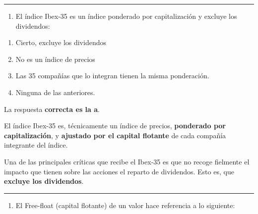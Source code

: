 \documentclass[
  letterpaper,
  DIV=11,
  numbers=noendperiod]{scrreprt}
\providecommand{\tightlist}{%
  \setlength{\itemsep}{0pt}\setlength{\parskip}{0pt}}\usepackage{longtable,booktabs,array}
\begin{document}
\begin{center}\rule{0.5\linewidth}{0.5pt}\end{center}

\begin{enumerate}
\def\labelenumi{\arabic{enumi}.}
\setcounter{enumi}{30}
\tightlist
\item
  El índice Ibex-35 es un índice ponderado por capitalización y excluye
  los dividendos:
\end{enumerate}

\begin{enumerate}
\def\labelenumi{\alph{enumi})}
\item
  Cierto, excluye los dividendos
\item
  No es un índice de precios
\item
  Las 35 compañías que lo integran tienen la misma ponderación.
\item
  Ninguna de las anteriores.
\end{enumerate}

\begin{tcolorbox}[enhanced jigsaw, left=2mm, opacityback=0, colback=white, breakable, arc=.35mm, bottomrule=.15mm, rightrule=.15mm, toprule=.15mm, leftrule=.75mm, colframe=quarto-callout-tip-color-frame]
\begin{minipage}[t]{5.5mm}
\textcolor{quarto-callout-tip-color}{\faLightbulb}
\end{minipage}%
\begin{minipage}[t]{\textwidth - 5.5mm}

La respuesta \textbf{correcta es la a}.

El índice Ibex-35 es, técnicamente un índice de precios,
\textbf{ponderado por capitalización}, y \textbf{ajustado por el capital
flotante} de cada compañía integrante del índice.

Una de las principales críticas que recibe el Ibex-35 es que no recoge
fielmente el impacto que tienen sobre las acciones el reparto de
dividendos. Esto es, que \textbf{excluye los dividendos}.

\end{minipage}%
\end{tcolorbox}

\begin{center}\rule{0.5\linewidth}{0.5pt}\end{center}

\begin{enumerate}
\def\labelenumi{\arabic{enumi}.}
\setcounter{enumi}{31}
\tightlist
\item
  El Free-float (capital flotante) de un valor hace referencia a lo
  siguiente:
\end{enumerate}
\end{document}
